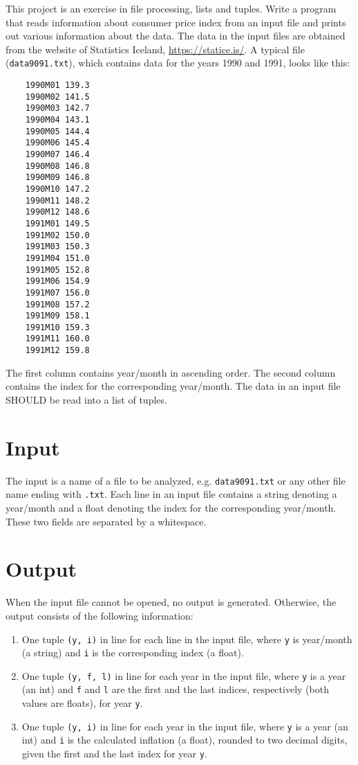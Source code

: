 
This project is an exercise in file processing, lists and tuples.
Write a program that reads information about consumer price index from an input file and prints out various information about the data.
The data in the input files are obtained from the website of Statistics Iceland, \url{https://statice.is/}.
A typical file (\texttt{data9091.txt}), which contains data for the years 1990 and 1991, looks like this:

\begin{verbatim}
    1990M01	139.3
    1990M02	141.5
    1990M03	142.7
    1990M04	143.1
    1990M05	144.4
    1990M06	145.4
    1990M07	146.4
    1990M08	146.8
    1990M09	146.8
    1990M10	147.2
    1990M11	148.2
    1990M12	148.6
    1991M01	149.5
    1991M02	150.0
    1991M03	150.3
    1991M04	151.0
    1991M05	152.8
    1991M06	154.9
    1991M07	156.0
    1991M08	157.2
    1991M09	158.1
    1991M10	159.3
    1991M11	160.0
    1991M12	159.8    
\end{verbatim}
The first column contains year/month in ascending order. The second column contains the index for the corresponding year/month.
The data in an input file SHOULD be read into a list of tuples. 

\section*{Input}
The input is a name of a file to be analyzed, e.g. \texttt{data9091.txt} or any other file name ending with \texttt{.txt}.
Each line in an input file contains a string denoting a year/month and a float denoting the index for the corresponding year/month. 
These two fields are separated by a whitespace.

\section*{Output}
When the input file cannot be opened, no output is generated.  Otherwise, the output consists of the following information:
\begin{enumerate}
    \item One tuple \texttt{(y, i)} in line for each line in the input file, where \texttt{y} is year/month (a string) and \texttt{i} is the corresponding index (a float).
    \item One tuple \texttt{(y, f, l)} in line for each year in the input file, where \texttt{y} is a year (an int) and \texttt{f} and \texttt{l} are the first and the last indices, respectively (both values are floats), for year \texttt{y}. 
    \item One tuple \texttt{(y, i)} in line for each year in the input file, where \texttt{y} is a year (an int) and \texttt{i} is the calculated inflation (a float), rounded to two decimal digits, given the first and the last index for year \texttt{y}.  
\end{enumerate}

